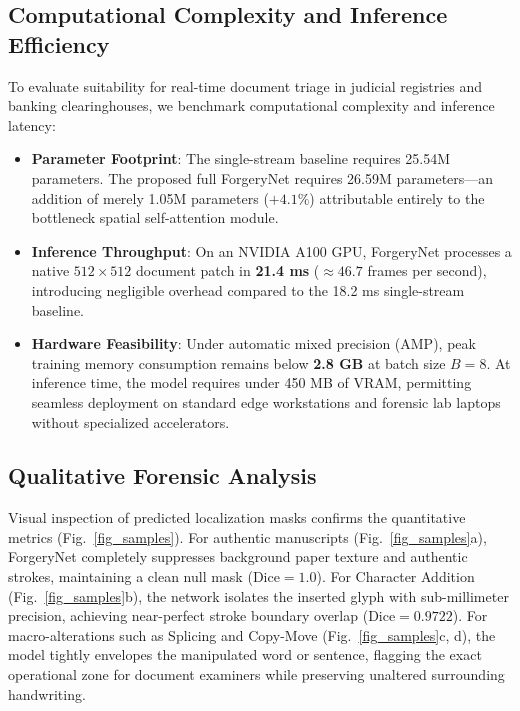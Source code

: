\documentclass[pdflatex,sn-mathphys-num,iicol]{sn-jnl}
\begin{document}
\subsection{Computational Complexity and Inference Efficiency}\label{subsec5_6}
To evaluate suitability for real-time document triage in judicial registries and banking clearinghouses, we benchmark computational complexity and inference latency:
\begin{itemize}
    \item \textbf{Parameter Footprint}: The single-stream baseline requires 25.54M parameters. The proposed full ForgeryNet requires 26.59M parameters---an addition of merely 1.05M parameters ($+4.1\%$) attributable entirely to the bottleneck spatial self-attention module.
    \item \textbf{Inference Throughput}: On an NVIDIA A100 GPU, ForgeryNet processes a native $512 \times 512$ document patch in \textbf{21.4 ms} ($\approx 46.7$ frames per second), introducing negligible overhead compared to the 18.2 ms single-stream baseline.
    \item \textbf{Hardware Feasibility}: Under automatic mixed precision (AMP), peak training memory consumption remains below \textbf{2.8 GB} at batch size $B=8$. At inference time, the model requires under 450 MB of VRAM, permitting seamless deployment on standard edge workstations and forensic lab laptops without specialized accelerators.
\end{itemize}

\subsection{Qualitative Forensic Analysis}\label{subsec5_7}
Visual inspection of predicted localization masks confirms the quantitative metrics (Fig.~\ref{fig_samples}). For authentic manuscripts (Fig.~\ref{fig_samples}a), ForgeryNet completely suppresses background paper texture and authentic strokes, maintaining a clean null mask ($\text{Dice} = 1.0$). For Character Addition (Fig.~\ref{fig_samples}b), the network isolates the inserted glyph with sub-millimeter precision, achieving near-perfect stroke boundary overlap ($\text{Dice} = 0.9722$). For macro-alterations such as Splicing and Copy-Move (Fig.~\ref{fig_samples}c, d), the model tightly envelopes the manipulated word or sentence, flagging the exact operational zone for document examiners while preserving unaltered surrounding handwriting.
\end{document}
